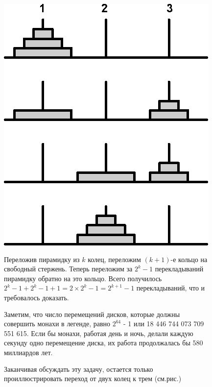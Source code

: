 \par
\begin{figure}[h]
\begin{minipage}{0.25\linewidth}
    \includegraphics[width=0.95\columnwidth]{img/sobor_3.png}
\end{minipage}
\hfill
\begin{minipage}{0.69\linewidth}\setlength{\parindent}{1.5em}
Переложив пирамидку из $k$ колец, переложим $(k + 1)$-е кольцо на свободный стержень. Теперь переложим за $2^k - 1$ перекладываний пирамидку обратно на это кольцо. Всего получилось $2^k - 1 + 2^k - 1 + 1 = 2 \times 2^k - 1 = 2^{k + 1} - 1$ перекладываний, что и требовалось доказать.
\par
Заметим, что число перемещений дисков, которые должны совершить монахи в легенде, равно $2^{64}$ - 1 или 18 446 744 073 709 551 615. Если бы монахи, работая день и ночь, делали каждую секунду одно перемещение диска, их работа продолжалась бы 580 миллиардов лет.
\par
Заканчивая обсуждать эту задачу, остается только проиллюстрировать
переход от двух колец к трем (см.рис.)
\end{minipage}
\end{figure}

